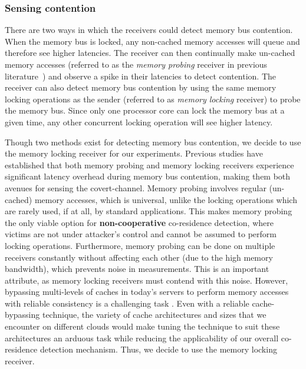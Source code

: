 \subsubsection{Sensing contention} 
There are two ways in which the receivers could detect memory bus contention.
When the memory bus is locked, any non-cached memory accesses will queue and
therefore see higher latencies. The receiver can then continually make un-cached
memory accesses (referred to as the \textit{memory probing} receiver in previous
literature~\cite{varadarajan2015}) and observe a spike in their latencies to
detect contention.  The receiver can also detect memory bus contention by using
the same memory locking operations as the sender (referred to as \textit{memory
locking} receiver) to probe the memory bus. Since only one processor core can
lock the memory bus at a given time, any other concurrent locking operation will
see higher latency. 

Though two methods exist for detecting memory bus contention, we decide to use
the memory locking receiver for our experiments. Previous
studies\cite{wuusenix2012,varadarajan2015} have established that both memory
probing and memory locking receivers experience significant latency overhead
during memory bus contention, making them both avenues for sensing the
covert-channel. Memory probing involves regular (un-cached) memory accesses,
which is universal, unlike the locking operations which are rarely used, if at
all, by standard applications. This makes memory probing the only viable option
for \textbf{non-cooperative} co-residence detection, where victims are not under
attacker's control and cannot be assumed to perform locking operations.
Furthermore, memory probing can be done on multiple receivers constantly without
affecting each other (due to the high memory bandwidth), which prevents noise in
measurements. This is an important attribute, as memory locking receivers must
contend with this noise. However, bypassing multi-levels of caches in today's
servers to perform memory accesses with reliable consistency is a challenging
task . Even with a reliable cache-bypassing technique,
the variety of cache architectures and sizes that we encounter on different
clouds would make tuning the technique to suit these architectures an arduous
task while reducing the applicability of our overall co-residence detection
mechanism. Thus, we decide to use the memory locking receiver.


